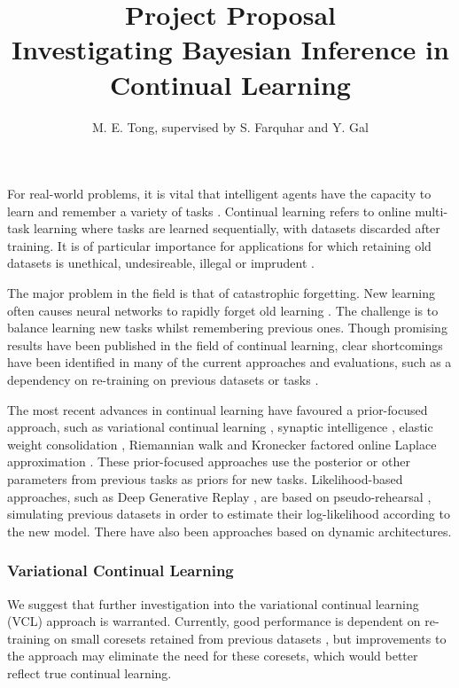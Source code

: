\documentclass[a4paper,11=0pt]{article}
\title{\vspace*{-2em}\textbf{Project Proposal}\\ \vspace{0.25em} \Large Investigating Bayesian Inference in Continual Learning}
\author{M. E. Tong, supervised by S. Farquhar and Y. Gal}
\date{}
\begin{document}
\maketitle


\vspace{-1em}
For real-world problems, it is vital that intelligent agents have the capacity to learn and remember a variety of tasks \cite{ewc}. Continual learning refers to online multi-task learning where tasks are learned sequentially, with datasets discarded after training. It is of particular importance for applications for which retaining old datasets is unethical, undesireable, illegal or imprudent \cite{unifying, robust}.

The major problem in the field is that of catastrophic forgetting. New learning often causes neural networks to rapidly forget old learning \cite{catastrophic}. The challenge is to balance learning new tasks whilst remembering previous ones. Though promising results have been published in the field of continual learning, clear shortcomings have been identified in many of the current approaches and evaluations, such as a dependency on re-training on previous datasets or tasks \cite{robust}. 

The most recent advances in continual learning have favoured a prior-focused approach, such as variational continual learning \cite{vcl}, synaptic intelligence \cite{si}, elastic weight consolidation \cite{ewc}, Riemannian walk \cite{rw} and Kronecker factored online Laplace approximation \cite{ritter}. These prior-focused approaches use the posterior or other parameters from previous tasks as priors for new tasks. Likelihood-based approaches, such as Deep Generative Replay \cite{dgr}, are based on pseudo-rehearsal \cite{robins}, simulating previous datasets in order to estimate their log-likelihood according to the new model. There have also been approaches based on dynamic architectures. %

\vspace{-1em}
\subsubsection*{Variational Continual Learning}

\vspace{-1em}
We suggest that further investigation into the variational continual learning (VCL) approach \cite{vcl} is warranted. Currently, good performance is dependent on re-training on small coresets retained from previous datasets \cite{robust}, but improvements to the approach may eliminate the need for these coresets, which would better reflect true continual learning.
\end{document}
